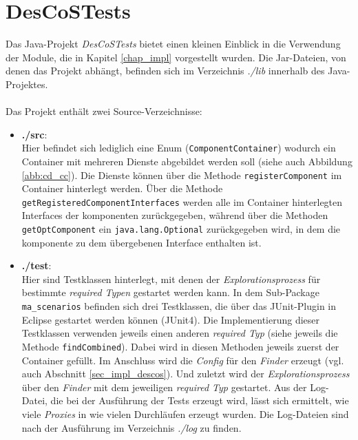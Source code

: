 \chapter{DesCoSTests}\label{app_test}
Das Java-Projekt \emph{DesCoSTests} bietet einen kleinen Einblick in die Verwendung der \Gls{Modul}e, die in Kapitel \ref{chap_impl} vorgestellt wurden. Die Jar-Dateien, von denen das Projekt abhängt, befinden sich im Verzeichnis \emph{./lib} innerhalb des Java-Projektes.
\\\\
Das Projekt enthält zwei Source-Verzeichnisse:
\begin{itemize}
\item \textbf{./src}: \\
Hier befindet sich lediglich eine Enum (\texttt{ComponentContainer}) wodurch ein Container mit mehreren Dienste abgebildet werden soll (siehe auch Abbildung \ref{abb:cd_cc}). Die Dienste können über die Methode \texttt{registerComponent} im Container hinterlegt werden. Über die Methode \texttt{getRegisteredComponentInterfaces} werden alle im Container hinterlegten \Gls{Interface}s der \Gls{komponente}n zurückgegeben, während über die Methoden \texttt{getOptComponent} ein \texttt{java.lang.Optional} zurückgegeben wird, in dem die \Gls{komponente} zu dem übergebenen \Gls{Interface} enthalten ist.

\item \textbf{./test}:\\
Hier sind Testklassen hinterlegt, mit denen der \emph{Explorationsprozess} für bestimmte \emph{required Typen} gestartet werden kann. In dem Sub-Package \texttt{ma\_scenarios} befinden sich drei Testklassen, die über das JUnit-Plugin in Eclipse gestartet werden können (JUnit4). Die Implementierung dieser Testklassen verwenden jeweils einen anderen \emph{required Typ} (siehe jeweils die Methode \texttt{findCombined}). Dabei wird in diesen Methoden jeweils zuerst der Container gefüllt. Im Anschluss wird die \emph{Config} für den \emph{Finder} erzeugt (vgl. auch Abschnitt \ref{sec_impl_descos}). Und zuletzt wird der \emph{Explorationsprozess} über den \emph{Finder} mit dem jeweiligen \emph{required Typ} gestartet. Aus der Log-Datei, die bei der Ausführung der Tests erzeugt wird, lässt sich ermittelt, wie viele \emph{Proxies} in wie vielen Durchläufen erzeugt wurden. Die Log-Dateien sind nach der Ausführung im Verzeichnis \emph{./log} zu finden.
\end{itemize}
